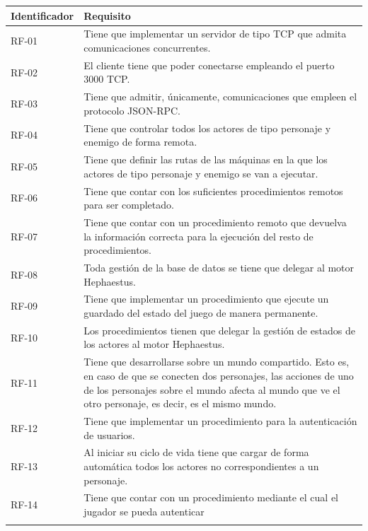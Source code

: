 {\footnotesize
\begin{tabularx}{\textwidth}{|l|X|}
	\hline
	\rowcolor[HTML]{C0C0C0}
	\textbf{Identificador} & \textbf{Requisito} \\ \hline
	RF-01 & Tiene que implementar un servidor de tipo TCP que admita comunicaciones concurrentes. \\ \hline
	RF-02 & El cliente tiene que poder conectarse empleando el puerto 3000 TCP. \\ \hline
	RF-03 & Tiene que admitir, únicamente, comunicaciones que empleen el protocolo JSON-RPC. \\ \hline
	RF-04 & Tiene que controlar todos los actores de tipo personaje y enemigo de forma remota. \\ \hline
	RF-05 & Tiene que definir las rutas de las máquinas en la que los actores de tipo personaje y enemigo se van a ejecutar. \\ \hline
	RF-06 & Tiene que contar con los suficientes procedimientos remotos para ser completado. \\ \hline
	RF-07 & Tiene que contar con un procedimiento remoto que devuelva la información correcta para la ejecución del resto de procedimientos. \\ \hline
	RF-08 & Toda gestión de la base de datos se tiene que delegar al motor Hephaestus. \\ \hline
	RF-09 & Tiene que implementar un procedimiento que ejecute un guardado del estado del juego de manera permanente. \\ \hline
	RF-10 & Los procedimientos tienen que delegar la gestión de estados de los actores al motor Hephaestus. \\ \hline
	RF-11 & Tiene que desarrollarse sobre un mundo compartido. Esto es, en caso de que se conecten dos personajes, las acciones de uno de los personajes sobre el mundo afecta al mundo que ve el otro personaje, es decir, es el mismo mundo. \\ \hline
	RF-12 & Tiene que implementar un procedimiento para la autenticación de usuarios. \\ \hline
	RF-13 & Al iniciar su ciclo de vida tiene que cargar de forma automática todos los actores no correspondientes a un personaje. \\ \hline
	RF-14 & Tiene que contar con un procedimiento mediante el cual el jugador se pueda autenticar \\ \hline
	
	\caption{Juego didáctico. Requisitos funcionales}
	\label{tab:juego-req-func}
\end{tabularx}
}

